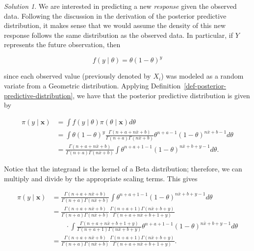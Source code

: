 \documentclass[
  letterpaper,
  DIV=11,
  numbers=noendperiod]{scrreprt}
\theoremstyle{definition}
\theoremstyle{plain}
\theoremstyle{definition}
\theoremstyle{remark}
\newtheorem*{solution}{Solution}
\begin{document}
\begin{solution}

We are interested in predicting a new \emph{response} given the observed
data. Following the discussion in the derivation of the posterior
predictive distribution, it makes sense that we would assume the density
of this new response follows the same distribution as the observed data.
In particular, if \(Y\) represents the future observation, then

\[f(y \mid \theta) = \theta (1 - \theta)^y\]

since each observed value (previously denoted by \(X_i\)) was modeled as
a random variate from a Geometric distribution. Applying
Definition~\ref{def-posterior-predictive-distribution}, we have that the
posterior predictive distribution is given by

\[
\begin{aligned}
  \pi(y \mid \mathbf{x})
    &= \int f\left(y \mid \theta\right) \pi(\theta \mid \mathbf{x}) d\theta \\
    &= \int \theta (1 - \theta)^y \frac{\Gamma(n + a + n\bar{x} + b)}{\Gamma(n + a) \Gamma(n\bar{x} + b)} \theta^{n + a - 1} (1 - \theta)^{n\bar{x} + b - 1} d\theta \\
    &= \frac{\Gamma(n + a + n\bar{x} + b)}{\Gamma(n + a) \Gamma(n\bar{x} + b)} \int \theta^{n + a + 1 - 1} (1 - \theta)^{n\bar{x} + b + y - 1} d\theta. 
\end{aligned}
\]

Notice that the integrand is the kernel of a Beta distribution;
therefore, we can multiply and divide by the appropriate scaling terms.
This gives

\[
\begin{aligned}
  \pi(y \mid \mathbf{x})
    &= \frac{\Gamma(n + a + n\bar{x} + b)}{\Gamma(n + a) \Gamma(n\bar{x} + b)} \int \theta^{n + a + 1 - 1} (1 - \theta)^{n\bar{x} + b + y - 1} d\theta \\
    &= \frac{\Gamma(n + a + n\bar{x} + b)}{\Gamma(n + a) \Gamma(n\bar{x} + b)} \frac{\Gamma(n + a + 1) \Gamma(n\bar{x} + b + y)}{\Gamma(n + a + n\bar{x} + b + 1 + y)} \\
    &\qquad \cdot \int \frac{\Gamma(n + a + n\bar{x} + b + 1 + y)}{\Gamma(n + a + 1) \Gamma(n\bar{x} + b + y)} \theta^{n + a + 1 - 1} (1 - \theta)^{n\bar{x} + b + y - 1} d\theta \\
    &= \frac{\Gamma(n + a + n\bar{x} + b)}{\Gamma(n + a) \Gamma(n\bar{x} + b)} \frac{\Gamma(n + a + 1) \Gamma(n\bar{x} + b + y)}{\Gamma(n + a + n\bar{x} + b + 1 + y)}.
\end{aligned}
\]


\end{solution}
\end{document}
